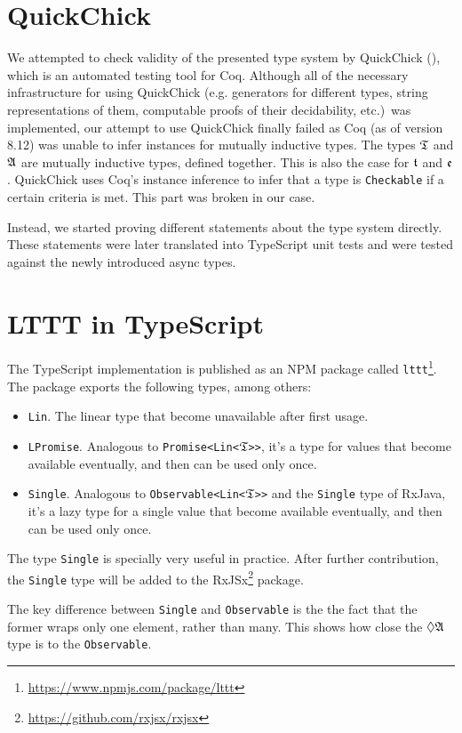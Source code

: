 \section{QuickChick}

We attempted to check validity of the presented type system by QuickChick (\cite{DBLP:conf/itp/Paraskevopoulou15}), which is an automated testing tool for Coq. Although all of the necessary infrastructure for using QuickChick (e.g. generators for different types, string representations of them, computable proofs of their decidability, etc.)~was implemented, our attempt to use QuickChick finally failed as Coq (as of version 8.12) was unable to infer instances for mutually inductive types. The types $\mathfrak{T}$ and $\mathfrak{A}$ are mutually inductive types, defined together. This is also the case for $\mathfrak{t}$ and $\mathfrak{e}$. QuickChick uses Coq's instance inference to infer that a type is \texttt{Checkable} if a certain criteria is met. This part was broken in our case.

Instead, we started proving different statements about the type system directly. These statements were later translated into TypeScript unit tests and were tested against the newly introduced async types.

\section{LTTT in TypeScript}

The TypeScript implementation is published as an NPM package called \texttt{lttt}\footnote{\url{https://www.npmjs.com/package/lttt}}. The package exports the following types, among others:
\begin{itemize}
    \item \texttt{Lin}. The linear type that become unavailable after first usage.
    \item \texttt{LPromise}. Analogous to \texttt{Promise<Lin<}$\mathfrak{T}$\texttt{>{}>}, it's a type for values that become available eventually, and then can be used only once.
    \item \texttt{Single}. Analogous to \texttt{Observable<Lin<}$\mathfrak{T}$\texttt{>{}>} and the \texttt{Single} type of RxJava, it's a lazy type for a single value that become available eventually, and then can be used only once.
\end{itemize}

The type \texttt{Single} is specially very useful in practice. After further contribution, the \texttt{Single} type will be added to the RxJSx\footnote{\url{https://github.com/rxjsx/rxjsx}} package.

The key difference between \texttt{Single} and \texttt{Observable} is the the fact that the former wraps only one element, rather than many. This shows how close the $\lozenge\mathfrak{A}$ type is to the \texttt{Observable}.